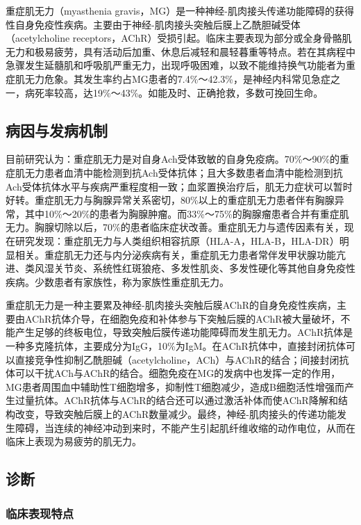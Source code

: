重症肌无力（myasthenia
gravis，MG）是一种神经-肌肉接头传递功能障碍的获得性自身免疫性疾病。主要由于神经-肌肉接头突触后膜上乙酰胆碱受体（acetylcholine
receptors，AChR）受损引起。临床主要表现为部分或全身骨骼肌无力和极易疲劳，具有活动后加重、休息后减轻和晨轻暮重等特点。若在其病程中急骤发生延髓肌和呼吸肌严重无力，出现呼吸困难，以致不能维持换气功能者为重症肌无力危象。其发生率约占MG患者的7.4\%～42.3\%，是神经内科常见急症之一，病死率较高，达19\%～43\%。如能及时、正确抢救，多数可挽回生命。

\subsection{病因与发病机制}

目前研究认为：重症肌无力是对自身Ach受体致敏的自身免疫病。70\%～90\%的重症肌无力患者血清中能检测到抗Ach受体抗体；且大多数患者血清中能检测到抗Ach受体抗体水平与疾病严重程度相一致；血浆置换治疗后，肌无力症状可以暂时好转。重症肌无力与胸腺异常关系密切，80\%以上的重症肌无力患者伴有胸腺异常，其中10\%～20\%的患者为胸腺肿瘤。而33\%～75\%的胸腺瘤患者合并有重症肌无力。胸腺切除以后，70\%的患者临床症状改善。重症肌无力与遗传因素有关，现在研究发现：重症肌无力与人类组织相容抗原（HLA-A，HLA-B，HLA-DR）明显相关。重症肌无力还与内分泌疾病有关，重症肌无力患者常伴发甲状腺功能亢进、类风湿关节炎、系统性红斑狼疮、多发性肌炎、多发性硬化等其他自身免疫性疾病。少数患者有家族性，称为家族性重症肌无力。

重症肌无力是一种主要累及神经-肌肉接头突触后膜AChR的自身免疫性疾病，主要由AChR抗体介导，在细胞免疫和补体参与下突触后膜的AChR被大量破坏，不能产生足够的终板电位，导致突触后膜传递功能障碍而发生肌无力。AChR抗体是一种多克隆抗体，主要成分为IgG，10\%为IgM。在AChR抗体中，直接封闭抗体可以直接竞争性抑制乙酰胆碱（acetylcholine，ACh）与AChR的结合；间接封闭抗体可以干扰ACh与AChR的结合。细胞免疫在MG的发病中也发挥一定的作用，MG患者周围血中辅助性T细胞增多，抑制性T细胞减少，造成B细胞活性增强而产生过量抗体。AChR抗体与AChR的结合还可以通过激活补体而使AChR降解和结构改变，导致突触后膜上的AChR数量减少。最终，神经-肌肉接头的传递功能发生障碍，当连续的神经冲动到来时，不能产生引起肌纤维收缩的动作电位，从而在临床上表现为易疲劳的肌无力。

\subsection{诊断}

\subsubsection{临床表现特点}

